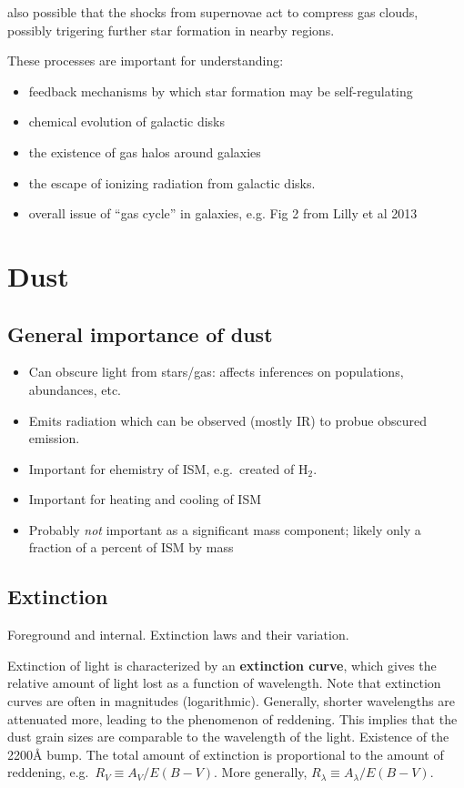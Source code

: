 \documentclass{article}
\begin{document}
also possible that the shocks from supernovae act to compress gas clouds,
possibly trigering further star formation in nearby regions.

These processes are important for understanding:
\begin{itemize}
    \item feedback mechanisms by which star formation may be self-regulating
    \item chemical evolution of galactic disks
    \item the existence of gas halos around galaxies
    \item the escape of ionizing radiation from galactic disks.
    \item overall issue of ``gas cycle'' in galaxies, e.g. Fig 2 from Lilly
        et al 2013
\end{itemize}

\newpage
\section{Dust}
\subsection{General importance of dust}
\begin{itemize}
    \item Can obscure light from stars/gas: affects inferences on
        populations, abundances, etc.
    \item Emits radiation which can be observed (mostly IR) to probue
        obscured emission.
    \item Important for ehemistry of ISM, e.g.\ created of H$_{2}$.
    \item Important for heating and cooling of ISM
    \item Probably \emph{not} important as a significant mass component;
        likely only a fraction of a percent of ISM by mass
\end{itemize}

\subsection{Extinction}
Foreground and internal. Extinction laws and their variation.

Extinction of light is characterized by an \textbf{extinction curve}, which gives
the relative amount of light lost as a function of wavelength. Note that
extinction curves are often in magnitudes (logarithmic). Generally,
shorter wavelengths are attenuated more, leading to the phenomenon of
reddening. This implies that the dust grain sizes are comparable to the
wavelength of the light. \textcolor{bred}{Existence of the 2200\AA{} bump.}
The total amount of extinction is proportional to the amount of reddening,
e.g.\ $R_{V} \equiv A_{V}/E(B-V)$.
More generally, $R_{\lambda} \equiv A_{\lambda}/E(B-V)$.
\end{document}
